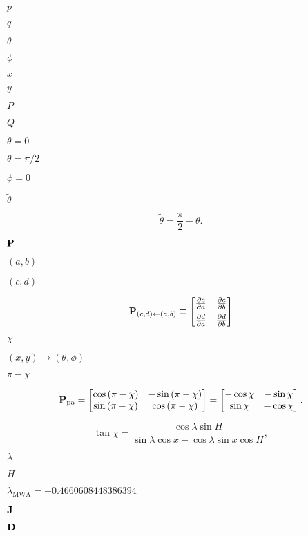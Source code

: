 \documentclass{article}
\begin{document}
$p$
\pagebreak

$q$
\pagebreak

$\theta$
\pagebreak

$\phi$
\pagebreak

$x$
\pagebreak

$y$
\pagebreak

$P$
\pagebreak

$Q$
\pagebreak

$\theta = 0$
\pagebreak

$\theta = \pi/2$
\pagebreak

$\phi = 0$
\pagebreak

$\tilde{\theta}$
\pagebreak

\[ \tilde{\theta} = \frac{\pi}{2} - \theta. \]
\pagebreak

${\bf P}$
\pagebreak

$(a,b)$
\pagebreak

$(c,d)$
\pagebreak

\[ {\bf P}_{(c,d)\leftarrow(a,b)} \equiv \begin{bmatrix} \frac{\partial c}{\partial a} & \frac{\partial c}{\partial b} \\[5 pt] \frac{\partial d}{\partial a} & \frac{\partial d}{\partial b} \end{bmatrix} \]
\pagebreak

$\chi$
\pagebreak

$(x,y)\rightarrow(\theta,\phi)$
\pagebreak

$\pi - \chi$
\pagebreak

\[ {\bf P}_\text{pa} = \begin{bmatrix} \cos\left(\pi - \chi\right) & -\sin\left(\pi - \chi\right) \\ \sin\left(\pi - \chi\right) & \cos\left(\pi - \chi\right) \end{bmatrix} = \begin{bmatrix} -\cos\chi & -\sin\chi \\ \sin\chi & -\cos\chi \end{bmatrix}. \]
\pagebreak

\[ \tan \chi = \frac{\cos \lambda \sin H}{\sin\lambda \cos x - \cos \lambda \sin x \cos H}, \]
\pagebreak

$\lambda$
\pagebreak

$H$
\pagebreak

$\lambda_\text{MWA} = -0.4660608448386394$
\pagebreak

${\bf J}$
\pagebreak

${\bf D}$
\pagebreak
\end{document}
